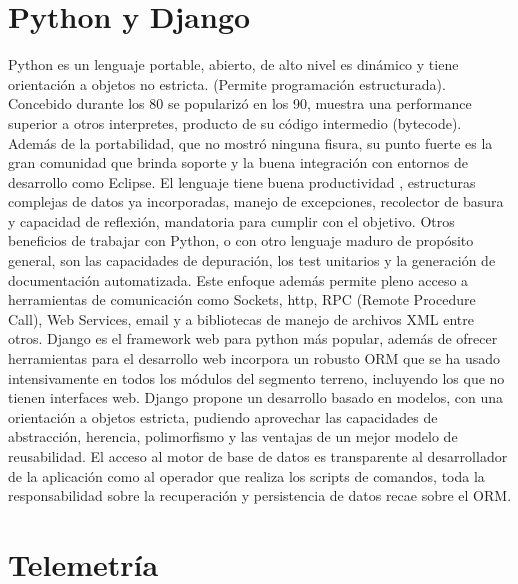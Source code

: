 \documentclass[twoside,twocolumn]{article}
\begin{document}
\section{Python y Django}

Python es un lenguaje portable, abierto, de alto nivel es dinámico y tiene orientación a objetos no estricta. (Permite programación estructurada). Concebido durante los 80 se popularizó en los 90, muestra una performance superior a otros interpretes, producto de su código intermedio (bytecode). Además de la portabilidad, que no mostró ninguna fisura, su punto fuerte es la gran comunidad que brinda soporte y la buena integración con entornos de desarrollo como Eclipse.  El lenguaje tiene buena productividad \cite{prechelt2000empirical}, estructuras complejas de datos ya incorporadas, manejo de excepciones, recolector de basura y capacidad de reflexión, mandatoria para cumplir con el objetivo. Otros beneficios de trabajar con Python, o con otro lenguaje maduro de propósito general, son las capacidades de depuración, los test unitarios y la generación de documentación automatizada. Este enfoque además permite pleno acceso a herramientas de comunicación como Sockets, http, RPC (Remote Procedure Call), Web Services, email y a bibliotecas de manejo de archivos XML entre otros. 
Django es el framework web para python más popular, además de ofrecer herramientas para el desarrollo web incorpora un robusto ORM que se ha usado intensivamente en todos los módulos del segmento terreno, incluyendo los que no tienen interfaces web. Django propone un desarrollo basado en modelos, con una orientación a objetos estricta, pudiendo aprovechar las capacidades de abstracción, herencia, polimorfismo y las ventajas de un mejor modelo de reusabilidad. El acceso al motor de base de datos es transparente al desarrollador de la aplicación como al operador que realiza los scripts de comandos, toda la responsabilidad sobre la recuperación y persistencia de datos recae sobre el ORM.  


\section{Telemetría}
\label{sec:telemetria}
\end{document}
